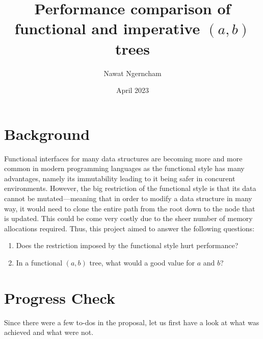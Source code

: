 \documentclass{article}
\title{Performance comparison of functional and imperative $(a, b)$ trees}
\author{Nawat Ngerncham}
\date{April 2023}
\begin{document}
\maketitle

\section{Background}

Functional interfaces for many data structures are becoming more and more common in 
modern programming languages as the functional style has many advantages, namely
its immutability leading to it being safer in concurent environments. However, the
big restriction of the functional style is that its data cannot be mutated---meaning
that in order to modify a data structure in many way, it would need to clone the entire
path from the root down to the node that is updated. This could be come very costly due
to the sheer number of memory allocations required. Thus, this project aimed to answer the following questions:

\begin{enumerate}
    \item Does the restriction imposed by the functional style hurt performance?
    \item In a functional $(a, b)$ tree, what would a good value for $a$ and $b$?
\end{enumerate}

\section{Progress Check}

Since there were a few to-dos in the proposal, let us first have a look at what was
achieved and what were not.
\end{document}
